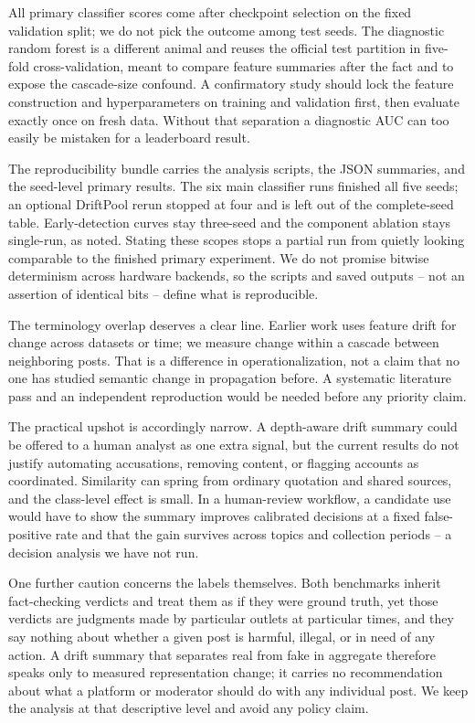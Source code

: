 \documentclass[conference]{IEEEtran}
\begin{document}
All primary classifier scores come after checkpoint selection on the fixed
validation split; we do not pick the outcome among test seeds. The diagnostic
random forest is a different animal and reuses the official test partition in
five-fold cross-validation, meant to compare feature summaries after the fact
and to expose the cascade-size confound. A confirmatory study should lock the
feature construction and hyperparameters on training and validation first, then
evaluate exactly once on fresh data. Without that separation a diagnostic AUC
can too easily be mistaken for a leaderboard result.

The reproducibility bundle carries the analysis scripts, the JSON summaries,
and the seed-level primary results. The six main classifier runs finished all
five seeds; an optional DriftPool rerun stopped at four and is left out of the
complete-seed table. Early-detection curves stay three-seed and the component
ablation stays single-run, as noted. Stating these scopes stops a partial run
from quietly looking comparable to the finished primary experiment. We do not
promise bitwise determinism across hardware backends, so the scripts and saved
outputs -- not an assertion of identical bits -- define what is reproducible.

The terminology overlap deserves a clear line. Earlier work uses feature drift
for change across datasets or time; we measure change within a cascade between
neighboring posts. That is a difference in operationalization, not a claim that
no one has studied semantic change in propagation before. A systematic
literature pass and an independent reproduction would be needed before any
priority claim.

The practical upshot is accordingly narrow. A depth-aware drift summary could
be offered to a human analyst as one extra signal, but the current results do
not justify automating accusations, removing content, or flagging accounts as
coordinated. Similarity can spring from ordinary quotation and shared sources,
and the class-level effect is small. In a human-review workflow, a candidate
use would have to show the summary improves calibrated decisions at a fixed
false-positive rate and that the gain survives across topics and collection
periods -- a decision analysis we have not run.

One further caution concerns the labels themselves. Both benchmarks inherit
fact-checking verdicts and treat them as if they were ground truth, yet those
verdicts are judgments made by particular outlets at particular times, and they
say nothing about whether a given post is harmful, illegal, or in need of any
action. A drift summary that separates real from fake in aggregate therefore
speaks only to measured representation change; it carries no recommendation
about what a platform or moderator should do with any individual post. We keep
the analysis at that descriptive level and avoid any policy claim.
\end{document}
